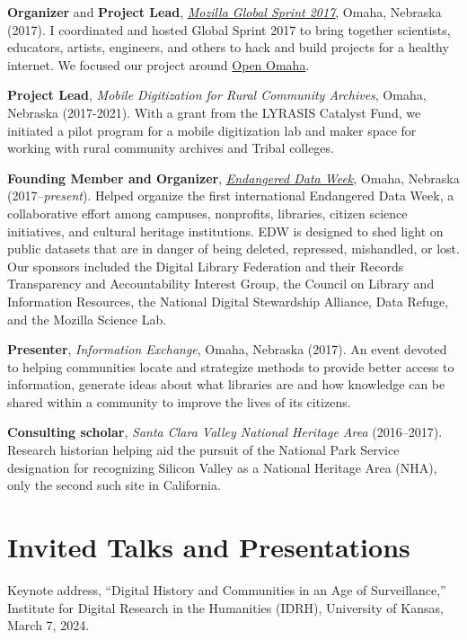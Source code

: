 \textbf{Organizer} and \textbf{Project Lead},
\emph{\href{https://mozilla.github.io/global-sprint/}{Mozilla Global
Sprint 2017}}, Omaha, Nebraska (2017). I coordinated and hosted Global
Sprint 2017 to bring together scientists, educators, artists, engineers,
and others to hack and build projects for a healthy internet. We focused
our project around \href{http://github.com/open-omaha/}{Open Omaha}.

\textbf{Project Lead}, \emph{Mobile Digitization for Rural Community
Archives}, Omaha, Nebraska (2017-2021). With a grant from the LYRASIS
Catalyst Fund, we initiated a pilot program for a mobile digitization
lab and maker space for working with rural community archives and Tribal
colleges.

\textbf{Founding Member and Organizer},
\emph{\href{http://endangereddataweek.org}{Endangered Data Week}},
Omaha, Nebraska (2017--\emph{present}). Helped organize the first
international Endangered Data Week, a collaborative effort among
campuses, nonprofits, libraries, citizen science initiatives, and
cultural heritage institutions. EDW is designed to shed light on public
datasets that are in danger of being deleted, repressed, mishandled, or
lost. Our sponsors included the Digital Library Federation and their
Records Transparency and Accountability Interest Group, the Council on
Library and Information Resources, the National Digital Stewardship
Alliance, Data Refuge, and the Mozilla Science Lab.

\textbf{Presenter}, \emph{Information Exchange}, Omaha, Nebraska (2017).
An event devoted to helping communities locate and strategize methods to
provide better access to information, generate ideas about what
libraries are and how knowledge can be shared within a community to
improve the lives of its citizens.

\textbf{Consulting scholar}, \emph{Santa Clara Valley National Heritage
Area} (2016--2017). Research historian helping aid the pursuit of the
National Park Service designation for recognizing Silicon Valley as a
National Heritage Area (NHA), only the second such site in California.

\section{Invited Talks and
Presentations}\label{invited-talks-and-presentations}

Keynote address, ``Digital History and Communities in an Age of
Surveillance,'' Institute for Digital Research in the Humanities (IDRH),
University of Kansas, March 7, 2024.

